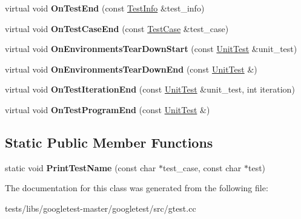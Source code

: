 \begin{DoxyCompactItemize}
\item 
\mbox{\label{classtesting_1_1internal_1_1PrettyUnitTestResultPrinter_a06749ff2b32a16c127374ecd015f13e0}} 
virtual void {\bfseries On\+Test\+End} (const \hyperlink{classtesting_1_1TestInfo}{Test\+Info} \&test\+\_\+info)
\item 
\mbox{\label{classtesting_1_1internal_1_1PrettyUnitTestResultPrinter_a7a62fe58fa6f6aace813eb62b31e5a51}} 
virtual void {\bfseries On\+Test\+Case\+End} (const \hyperlink{classtesting_1_1TestCase}{Test\+Case} \&test\+\_\+case)
\item 
\mbox{\label{classtesting_1_1internal_1_1PrettyUnitTestResultPrinter_afea9dc849c92fdbc1d8505f4c74ffc1a}} 
virtual void {\bfseries On\+Environments\+Tear\+Down\+Start} (const \hyperlink{classtesting_1_1UnitTest}{Unit\+Test} \&unit\+\_\+test)
\item 
\mbox{\label{classtesting_1_1internal_1_1PrettyUnitTestResultPrinter_ab23094ef3b714778b2f742d39818c280}} 
virtual void {\bfseries On\+Environments\+Tear\+Down\+End} (const \hyperlink{classtesting_1_1UnitTest}{Unit\+Test} \&)
\item 
\mbox{\label{classtesting_1_1internal_1_1PrettyUnitTestResultPrinter_ac29b30216023baddda04ef5889f484ff}} 
virtual void {\bfseries On\+Test\+Iteration\+End} (const \hyperlink{classtesting_1_1UnitTest}{Unit\+Test} \&unit\+\_\+test, int iteration)
\item 
\mbox{\label{classtesting_1_1internal_1_1PrettyUnitTestResultPrinter_a8c92c062889abdb940b04ffe113f5980}} 
virtual void {\bfseries On\+Test\+Program\+End} (const \hyperlink{classtesting_1_1UnitTest}{Unit\+Test} \&)
\end{DoxyCompactItemize}
\subsection*{Static Public Member Functions}
\begin{DoxyCompactItemize}
\item 
\mbox{\label{classtesting_1_1internal_1_1PrettyUnitTestResultPrinter_a5b60a9aed1db02837b11450f6e8d0f71}} 
static void {\bfseries Print\+Test\+Name} (const char $\ast$test\+\_\+case, const char $\ast$test)
\end{DoxyCompactItemize}


The documentation for this class was generated from the following file\+:\begin{DoxyCompactItemize}
\item 
tests/libs/googletest-\/master/googletest/src/gtest.\+cc\end{DoxyCompactItemize}
